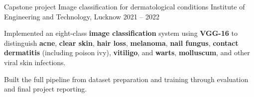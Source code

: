 

\begin{cventries}

  \cventry
    {Capstone project} %
    {Image classification for dermatological conditions} %
    {Institute of Engineering and Technology, Lucknow} %
    {2021 -- 2022} %
    {
      \begin{cvitems}
        \item {Implemented an eight-class \textbf{image classification} system using \textbf{VGG-16} to distinguish \textbf{acne}, \textbf{clear skin}, \textbf{hair loss}, \textbf{melanoma}, \textbf{nail fungus}, \textbf{contact dermatitis} (including poison ivy), \textbf{vitiligo}, and \textbf{warts}, \textbf{molluscum}, and other viral skin infections.}
        \item {Built the full pipeline from dataset preparation and training through evaluation and final project reporting.}
      \end{cvitems}
    }

\end{cventries}
